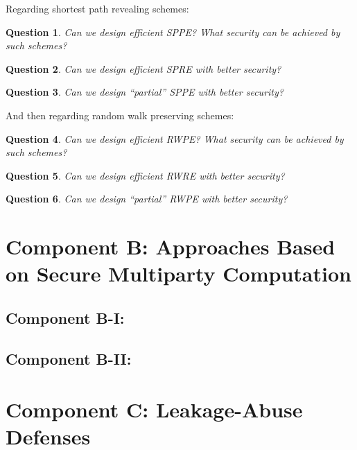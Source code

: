 \documentclass[11pt]{article}
\newtheorem{question}{Question}[section]
\theoremstyle{remark}
\begin{document}
Regarding shortest path revealing schemes: 

\begin{question}
Can we design efficient SPPE?  What security can be achieved by such schemes?
\end{question}


\begin{question}
Can we design efficient SPRE with better security?
\end{question}

\begin{question}
Can we design ``partial'' SPPE with better security?
\end{question}

And then regarding random walk preserving schemes:

\begin{question}
Can we design efficient RWPE?  What security can be achieved by such schemes?
\end{question}


\begin{question}
Can we design efficient RWRE with better security?
\end{question}

\begin{question}
Can we design ``partial'' RWPE with better security?
\end{question}


 \section{Component B: Approaches Based on Secure Multiparty Computation}

\subsection{Component B-I:  }

\subsection{Component B-II:  }


\section{Component C: Leakage-Abuse Defenses}

\end{document}
